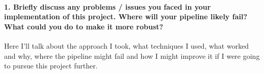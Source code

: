 \documentclass[11pt]{article}
\begin{document}
\paragraph{1. Briefly discuss any problems / issues you faced in your
implementation of this project. Where will your pipeline likely fail?
What could you do to make it more
robust?}\label{briefly-discuss-any-problems-issues-you-faced-in-your-implementation-of-this-project.-where-will-your-pipeline-likely-fail-what-could-you-do-to-make-it-more-robust}

Here I'll talk about the approach I took, what techniques I used, what
worked and why, where the pipeline might fail and how I might improve it
if I were going to pursue this project further.


    
    
    
    
\end{document}
